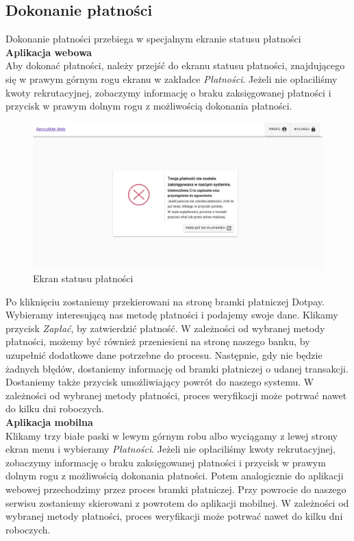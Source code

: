 \documentclass{article}
\begin{document}
\subsection{Dokonanie płatności}
Dokonanie płatności przebiega w specjalnym ekranie statusu płatności \\

\textbf{Aplikacja webowa} \\
Aby dokonać płatności, należy przejść do ekranu statusu płatności, znajdującego się w prawym górnym rogu ekranu w zakładce \emph{Płatności}.
Jeżeli nie opłaciliśmy kwoty rekrutacyjnej, zobaczymy informację o braku zaksięgowanej płatności i przycisk w prawym dolnym rogu z możliwością dokonania płatności.
\begin{figure}[H]
    \centering
    \includegraphics[width=1\linewidth]{images/web/payments.png}
    \caption{Ekran statusu płatności}
    \label{fig:test3_label}
\end{figure}
Po kliknięciu zostaniemy przekierowani na stronę bramki płatniczej Dotpay. Wybieramy interesującą nas metodę płatności i podajemy swoje dane. Klikamy przycisk \emph{Zapłać}, by zatwierdzić płatność. W zależności od wybranej metody płatności, możemy być również przeniesieni na stronę naszego banku, by uzupełnić dodatkowe dane potrzebne do procesu. Następnie, gdy nie będzie żadnych błędów, dostaniemy informację od bramki płatniczej o udanej transakcji. Dostaniemy także przycisk umożliwiający powrót do naszego systemu.
W zależności od wybranej metody płatności, proces weryfikacji może potrwać nawet do kilku dni roboczych. \\

\textbf{Aplikacja mobilna} \\
Klikamy trzy białe paski w lewym górnym robu albo wyciągamy z lewej strony ekran menu i wybieramy \emph{Płatności}. Jeżeli nie opłaciliśmy kwoty rekrutacyjnej, zobaczymy informację o braku zaksięgowanej płatności i przycisk w prawym dolnym rogu z możliwością dokonania płatności.
Potem analogicznie do aplikacji webowej przechodzimy przez proces bramki płatniczej. Przy powrocie do naszego serwisu zostaniemy skierowani z powrotem do aplikacji mobilnej.
W zależności od wybranej metody płatności, proces weryfikacji może potrwać nawet do kilku dni roboczych.
\end{document}
